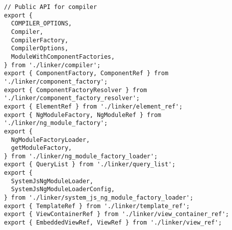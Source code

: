 \begin{verbatim}
// Public API for compiler
export {
  COMPILER_OPTIONS,
  Compiler,
  CompilerFactory,
  CompilerOptions,
  ModuleWithComponentFactories,
} from './linker/compiler';
export { ComponentFactory, ComponentRef } from './linker/component_factory';
export { ComponentFactoryResolver } from './linker/component_factory_resolver';
export { ElementRef } from './linker/element_ref';
export { NgModuleFactory, NgModuleRef } from './linker/ng_module_factory';
export {
  NgModuleFactoryLoader,
  getModuleFactory,
} from './linker/ng_module_factory_loader';
export { QueryList } from './linker/query_list';
export {
  SystemJsNgModuleLoader,
  SystemJsNgModuleLoaderConfig,
} from './linker/system_js_ng_module_factory_loader';
export { TemplateRef } from './linker/template_ref';
export { ViewContainerRef } from './linker/view_container_ref';
export { EmbeddedViewRef, ViewRef } from './linker/view_ref';
\end{verbatim}
